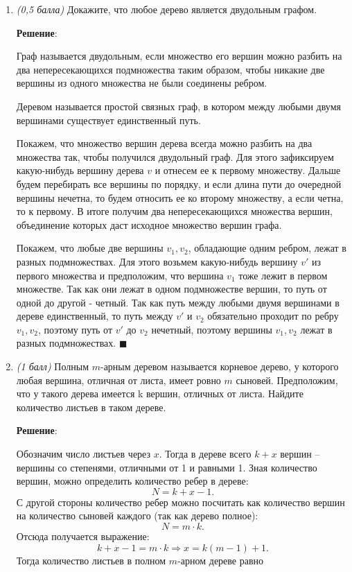 \documentclass{article}
\begin{document}
\begin{enumerate}
    \item \textit{(0,5 балла)} Докажите, что любое дерево является двудольным графом.
    
    \textbf{Решение}:

    Граф называется двудольным, если множество его вершин можно разбить на два непересекающихся подмножества таким образом, чтобы никакие две вершины из одного множества не были соединены ребром.

    Деревом называется простой связных граф, в котором между любыми двумя вершинами существует единственный путь.

    Покажем, что множество вершин дерева всегда можно разбить на два множества так, чтобы получился двудольный граф. Для этого зафиксируем какую-нибудь вершину дерева $v$ и отнесем ее к первому множеству. Дальше будем перебирать все вершины по порядку, и если длина пути до очередной вершины нечетна, то будем относить ее ко второму множеству, а если четна, то к первому. В итоге получим два непересекающихся множества вершин, объединение которых даст исходное множество вершин графа.

    Покажем, что любые две вершины $v_1, v_2$, обладающие одним ребром, лежат в разных подмножествах. Для этого возьмем какую-нибудь вершину $v'$ из первого множества и предположим, что вершина $v_1$ тоже лежит в первом множестве. Так как они лежат в одном подмножестве вершин, то путь от одной до другой - четный. Так как путь между любыми двумя вершинами в дереве единственный, то путь между $v'$ и $v_2$ обязательно проходит по ребру $v_1, v_2$, поэтому путь от $v'$ до $v_2$ нечетный, поэтому вершины $v_1, v_2$ лежат в разных подмножествах. $\blacksquare$

    \item \textit{(1 балл)} Полным $m$-арным деревом называется корневое дерево, у которого любая вершина, отличная от листа, имеет ровно $m$ сыновей. Предположим, что у такого дерева имеется k вершин, отличных от листа. Найдите количество листьев в таком дереве.
    
    \textbf{Решение}:

    Обозначим число листьев через $x$. Тогда в дереве всего $k+x$ вершин -- вершины со степенями, отличными от 1 и равными 1. Зная количество вершин, можно определить количество ребер в дереве:
    \begin{equation}
        N = k+x-1.
    \end{equation}
    С другой стороны количество ребер можно посчитать как количество вершин на количество сыновей каждого (так как дерево полное):
    \begin{equation}
        N = m \cdot k.
    \end{equation}
    Отсюда получается выражение:
    \begin{equation}
        k+x-1 = m \cdot k \Rightarrow x = k(m-1)+1.
    \end{equation}
    Тогда количество листьев в полном $m$-арном дереве равно


\end{enumerate}
\end{document}
